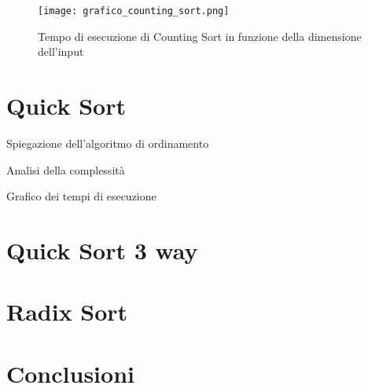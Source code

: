 \documentclass[a4paper, 12pt, oneside]{book}
\begin{document}
\begin{figure}[h]
    \centering
    \texttt{[image: grafico\_counting\_sort.png]}
    \caption{Tempo di esecuzione di Counting Sort in funzione della dimensione dell’input}
    \label{fig:counting-sort}
\end{figure}    


\chapter{Quick Sort}\label{chap:Quick Sort} %

Spiegazione dell'algoritmo di ordinamento

Analisi della complessità

Grafico dei tempi di esecuzione


\chapter{Quick Sort 3 way}\label{chap:Quick Sort 3 way} %


\chapter{Radix Sort}\label{chap:Radix Sort} %


\chapter{Conclusioni}\label{chap:Conclusioni} %

\end{document}
